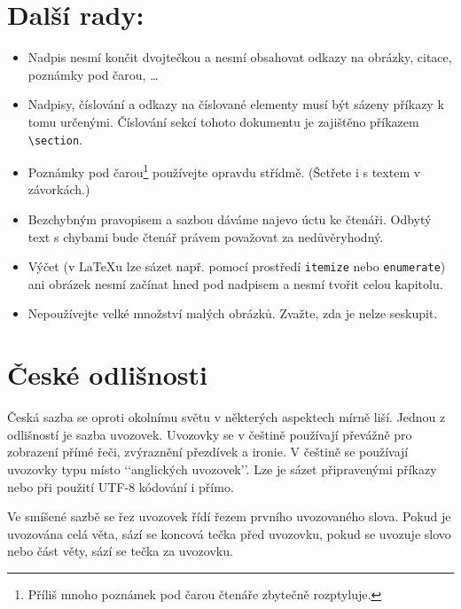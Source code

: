 \documentclass[10pt,a4paper,twocolumn, hidelinks]{article}
\begin{document}
\section{Další rady:}\label{sec:dalsi-rady}
\begin{itemize}
    \item Nadpis nesmí končit dvojtečkou a nesmí obsahovat odkazy na obrázky, citace, poznámky pod čarou, \dots

    \item Nadpisy, číslování a odkazy na číslované elementy musí být sázeny příkazy k tomu určenými.
Číslování sekcí tohoto dokumentu je zajištěno příkazem \verb|\section|.

    \item Poznámky pod čarou\footnote{Příliš mnoho poznámek pod čarou čtenáře zbytečně rozptyluje.} používejte opravdu střídmě.
(Šetřete i s textem v závorkách.)

    \item Bezchybným pravopisem a sazbou dáváme najevo úctu ke čtenáři.
Odbytý text s chybami bude čtenář právem považovat za nedůvěryhodný.

    \item Výčet (v \LaTeX u lze sázet např. pomocí prostředí \verb|itemize| nebo \verb|enumerate|) ani obrázek nesmí začínat hned pod nadpisem a nesmí tvořit celou kapitolu.

    \item Nepoužívejte velké množství malých obrázků.
Zvažte, zda je nelze seskupit.
\end{itemize}

\section{České odlišnosti}
Česká sazba se oproti okolnímu světu v některých aspektech mírně liší.
Jednou z odlišností je sazba uvozovek.
Uvozovky se v češtině používají převážně pro zobrazení přímé řeči, zvýraznění přezdívek a ironie.
V češtině se používají uvozovky typu  místo ‘‘anglických uvozovek’’.
Lze je sázet připravenými příkazy nebo při použití UTF-8 kódování i přímo.

Ve smíšené sazbě se řez uvozovek řídí řezem prvního uvozovaného slova. 
Pokud je uvozována celá věta, sází se koncová tečka před uvozovku, pokud se uvozuje slovo nebo část věty, sází se tečka za uvozovku.
\end{document}
